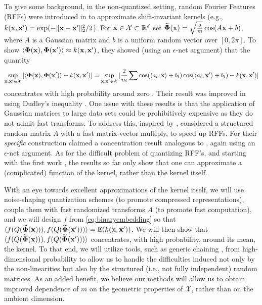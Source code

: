 To give some background, in the non-quantized setting, random Fourier Features (RFFs) were introduced in \cite{rahimi2008random} to approximate shift-invariant kernels (e.g., $k(\mathbf{x}, \mathbf{x}') = \exp(-\|\mathbf{x} - \mathbf{x}'\|_2^2/2$). For  $\mathbf{x}\in\mathcal{X}\subset \mathbb{R}^d$ \cite{rahimi2008random} set  $\widetilde{\mathbf{\Phi}}(\mathbf{x}) = \sqrt{\frac{2}{m}}\cos(A\mathbf{x} + b)$, where $A$ is a Gaussian matrix and $b$ is a uniform random vector over $[0, 2\pi]$. To show $\langle \mathbf{\Phi}(\mathbf{x}), \mathbf{\Phi}(\mathbf{x}')\rangle \approx k(\mathbf{x}, \mathbf{x}')$, they showed  (using an $\epsilon$-net argument) that the quantity
$$\sup_{\mathbf{x}, \mathbf{x}'\in\mathcal{X}}|\langle \mathbf{\Phi}(\mathbf{x}), \mathbf{\Phi}(\mathbf{x}')\rangle - k(\mathbf{x}, \mathbf{x}')| = \sup_{\mathbf{x}, \mathbf{x}'\in\mathcal{X}}|\frac{2}{m}\sum \cos(\langle a_i, \mathbf{x}\rangle + b_i)\cos(\langle a_i, \mathbf{x}'\rangle + b_i) - k(\mathbf{x}, \mathbf{x}')|$$
concentrates with high probability around zero \cite{ledoux2001concentration}. Their result was improved in  \cite{sriperumbudur2015optimal} using Dudley's inequality \cite{ledoux2001concentration}. %
One issue with these results is that the application of Gaussian matrices to large data sets could be prohibitively expensive as they do not admit fast transforms. To address this, inspired by \cite{dasgupta2011fast},  \cite{le2013fastfood} considered a structured random matrix $A$ with a fast matrix-vector multiply, to speed up RFFs. %
For their \emph{specific} construction \cite{le2014fastfood} claimed a concentration result analogous to  \cite{rahimi2008random}, again using an $\epsilon$-net argument. As for the difficult problem of quantizing RFF's, and starting with the first work  \cite{raginsky2009locality}, the results so far only show that one can approximate a (complicated) function of the kernel, rather than the kernel itself.

With an eye towards excellent approximations of the kernel itself, we will use noise-shaping quantization schemes (to promote compressed representations), couple them with fast randomized transforms $A$ (to promote fast computation), and we will design $f$ from \eqref{eq:binaryembedding} so that $\langle f(Q(\widetilde{\mathbf{\Phi}} (\mathbf{x}))), f(Q(\widetilde{\mathbf{\Phi}} (\mathbf{x}')))\rangle = \mathbb{E}( k(\mathbf{x},\mathbf{x}'))$. We will then show that $\langle f(Q(\widetilde{\mathbf{\Phi}} (\mathbf{x}))), f(Q(\widetilde{\mathbf{\Phi}} (\mathbf{x}')))\rangle$ concentrates, with high probability, around its mean, the kernel. To that end, we will utilize tools, such as generic chaining \cite{talagrand2006generic}, from high-dimensional probability \cite{vershynin2018high} to allow us to handle the difficulties induced not only by the non-linearities but also by the structured (i.e., not fully independent) random matrices. As an added benefit, we believe our methods will allow us to obtain improved dependence of $m$ on the geometric properties of $\mathcal{X}$, rather than on the ambient dimension.

